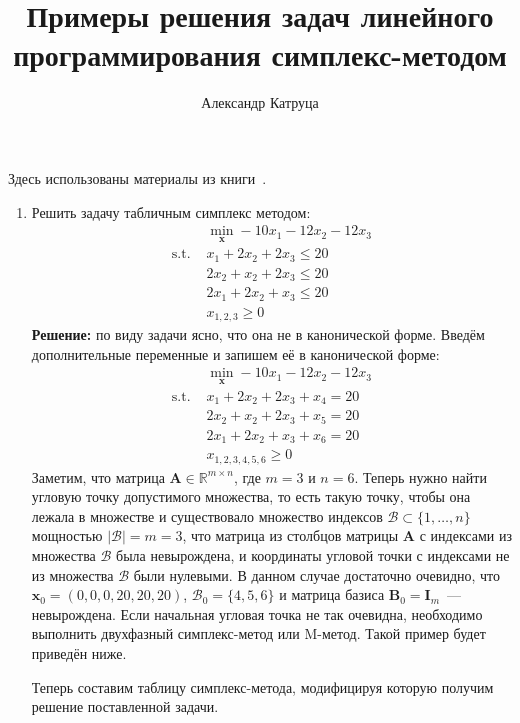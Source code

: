 \documentclass[12pt]{article}
\title{Примеры решения задач линейного программирования симплекс-методом}
\author{Александр Катруца}
\date{}
\newcommand{\bx}{\mathbf{x}}
\newcommand{\bA}{\mathbf{A}}
\begin{document}
\maketitle
\thispagestyle{empty}
Здесь использованы материалы из книги~\cite{intro2lin}. 
\begin{enumerate}
\item Решить задачу табличным симплекс методом:
\begin{equation*}
\begin{split}
& \min_{\bx} -10x_1 - 12x_2 - 12x_3\\
\text{s.t. } & x_1 + 2x_2 +2x_3 \leq 20\\
& 2x_2 + x_2 + 2x_3 \leq 20\\
& 2x_1 + 2x_2 + x_3 \leq 20\\
& x_{1,2,3} \geq 0
\end{split}
\end{equation*}
\textbf{Решение:} по виду задачи ясно, что она не в канонической  форме. Введём дополнительные переменные и запишем её в канонической форме:
\begin{equation*}
\begin{split}
& \min_{\bx} -10x_1 - 12x_2 - 12x_3\\
\text{s.t. } & x_1 + 2x_2 +2x_3 + x_4 = 20\\
& 2x_2 + x_2 + 2x_3 + x_5 = 20\\
& 2x_1 + 2x_2 + x_3 + x_6 = 20\\
& x_{1,2,3,4,5,6} \geq 0
\end{split}
\end{equation*}
Заметим, что матрица $\bA \in \mathbb{R}^{m \times n}$, где $m=3$ и $n=6$.
Теперь нужно найти угловую точку допустимого множества, то есть такую точку, чтобы она лежала в множестве и существовало множество индексов $\mathcal{B} \subset \{1, \dots, n\}$ мощностью $|\mathcal{B}| = m = 3$, что матрица из столбцов матрицы $\bA$ с индексами из множества $\mathcal{B}$ была невырождена, и координаты угловой точки с индексами не из множества $\mathcal{B}$ были нулевыми.
В данном случае достаточно очевидно, что $\bx_0 = (0, 0, 0, 20, 20, 20)$, $\mathcal{B}_0 = \{4, 5, 6 \}$ и матрица базиса $\mathbf{B}_0 = \mathbf{I}_m$~--- невырождена.
Если начальная угловая точка не так очевидна, необходимо выполнить двухфазный симплекс-метод или M-метод. 
Такой пример будет приведён ниже.

Теперь составим таблицу симплекс-метода, модифицируя которую получим решение поставленной задачи.


\end{enumerate}
\end{document}
